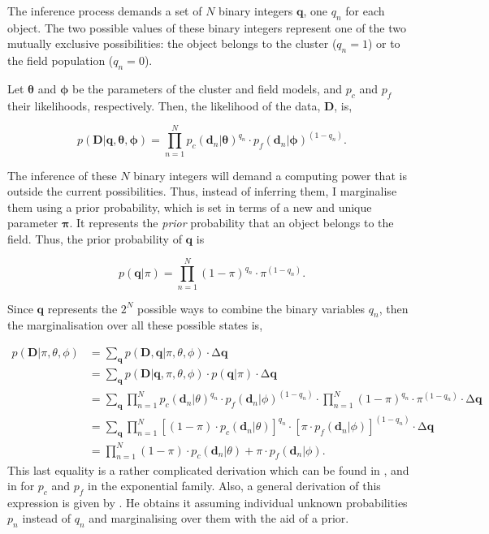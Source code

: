 The inference process demands a set of $N$ binary integers $\mathbf{q}$, one $q_n$ for each object. The two possible values of these binary integers represent one of the two mutually exclusive possibilities: the object belongs to the cluster ($q_n=1$) or to the field population ($q_n=0$). 

Let $\boldsymbol{\theta}$ and $\boldsymbol{\phi}$ be the parameters of the cluster and field models, and $p_c$ and $p_f$ their likelihoods, respectively. Then, the likelihood of the data, $\mathbf{D}$, is,

\begin{equation}
p(\mathbf{D}|\mathbf{q},\boldsymbol{\theta},\boldsymbol{\phi})= \prod_{n=1}^N {p_c(\mathbf{d}_n|\boldsymbol{\theta})}^{q_n}\cdot {p_f(\mathbf{d}_n|\boldsymbol{\phi})}^{(1-q_n)}.
\end{equation}

The inference of these $N$ binary integers will demand a computing power that is outside the current possibilities. Thus, instead of inferring them, I marginalise them using a prior probability, which is set in terms of a new and unique parameter $\boldsymbol{\pi}$. It represents the \emph{prior} probability that an object belongs to the field. Thus, the prior probability of $\mathbf{q}$ is

\begin{equation}
p(\mathbf{q}|\pi)= \prod_{n=1}^N {(1-\pi)}^{q_n}\cdot {\pi}^{(1-q_n)}.
\end{equation}

Since $\mathbf{q}$ represents the $2^N$ possible ways to combine the binary variables $q_n$, then the marginalisation over all these possible states is,

\begin{align}
p(\mathbf{D}|\pi,\theta,\phi)&=\sum_{\mathbf{q}} p(\mathbf{D},\mathbf{q}|\pi,\theta,\phi)\cdot \mathrm{\Delta}\mathbf{q} \nonumber\\
&=\sum_{\mathbf{q}} p(\mathbf{D}|\mathbf{q},\pi,\theta,\phi)\cdot p(\mathbf{q}|\pi)\cdot \mathrm{\Delta}\mathbf{q} \nonumber \\
&=\sum_{\mathbf{q}} \prod_{n=1}^N {p_c(\mathbf{d}_n|\theta)}^{q_n}\cdot {p_f(\mathbf{d}_n|\phi)}^{(1-q_n)}\cdot \prod_{n=1}^N {(1-\pi)}^{q_n}\cdot {\pi}^{(1-q_n)}\cdot \mathrm{\Delta}\mathbf{q} \nonumber \\
&=\sum_{\mathbf{q}} \prod_{n=1}^N \left[(1-\pi)\cdot p_c(\mathbf{d}_n|\theta)\right]^{q_n}\cdot \left[\pi\cdot p_f(\mathbf{d}_n|\phi)\right]^{(1-q_n)}\cdot \mathrm{\Delta}\mathbf{q} \nonumber \\
&=\prod_{n=1}^N (1-\pi)\cdot p_c(\mathbf{d}_n|\theta) + \pi\cdot p_f(\mathbf{d}_n|\phi).
\end{align}
This last equality is a rather complicated derivation which can be found in \citet{Press1997}, and in \citet{Hogg2010a} for $p_c$ and $p_f$ in the exponential family. Also, a general derivation of this expression is given by \citet{Jaynes2003}. He obtains it assuming individual unknown probabilities $p_n$ instead of $q_n$ and marginalising over them with the aid of a prior.

